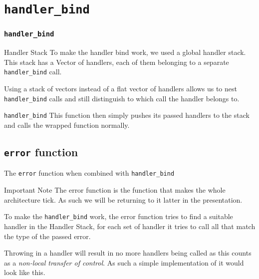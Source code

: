 \documentclass{beamer}
\begin{document}


\section{\texttt{handler\_bind}}
\begin{frame}
\frametitle{\texttt{handler\_bind}}

\begin{block}{Handler Stack}
To make the handler bind work, we used a global handler stack. This stack has a Vector of handlers, each
of them belonging to a separate \texttt{handler\_bind} call.

Using a stack of vectors instead of a flat vector of handlers allows us to nest \texttt{handler\_bind} calls
and still distinguish to which call the handler belongs to.
\end{block}

\begin{block}{\texttt{handler\_bind}}
This function then simply pushes its passed handlers to the stack and calls
the wrapped function normally.
\end{block}

\end{frame}

\subsection{\texttt{error} function}
\begin{frame}[fragile]{The \texttt{error} function when combined with \texttt{handler\_bind}}
\begin{alertblock}{Important Note}
The error function is the function that makes the whole architecture tick.
As such we will be returning to it latter in the presentation.
\end{alertblock}
\begin{block}{}
To make the \texttt{handler\_bind} work, the error function tries to find a suitable handler in the
Handler Stack, for each set of handler it tries to call all that match the type of the passed error.

Throwing in a handler will result in no more handlers being called as this counts as a
\textit{non-local transfer of control}. As such a simple implementation of it would look like this.
\end{block}
\end{frame}
\end{document}
